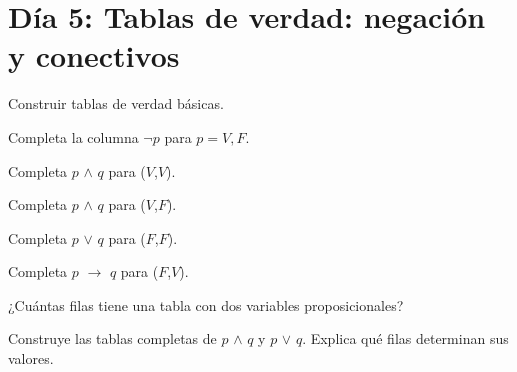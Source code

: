 \section{Día 5: Tablas de verdad: negación y conectivos}

\begin{lesson}[id=dia-05-lectura,weight=0]

Construir tablas de verdad básicas.

\end{lesson}

\begin{activity}[id=dia-05-corta-01,type=short,weight=1]

Completa la columna \(\neg p\) para \(p=V,F\).

\end{activity}

\begin{activity}[id=dia-05-corta-02,type=short,weight=1]

Completa \(p\) \(\land\) \(q\) para (\(V\),\(V\)).

\end{activity}

\begin{activity}[id=dia-05-corta-03,type=short,weight=1]

Completa \(p\) \(\land\) \(q\) para (\(V\),\(F\)).

\end{activity}

\begin{activity}[id=dia-05-corta-04,type=short,weight=1]

Completa \(p\) \(\lor\) \(q\) para (\(F\),\(F\)).

\end{activity}

\begin{activity}[id=dia-05-corta-05,type=short,weight=1]

Completa \(p\) \(\to\) \(q\) para (\(F\),\(V\)).

\end{activity}

\begin{activity}[id=dia-05-corta-06,type=short,weight=1]

¿Cuántas filas tiene una tabla con dos variables proposicionales?

\end{activity}

\begin{activity}[id=dia-05-desarrollo-01,type=long,weight=2]

Construye las tablas completas de \(p\) \(\land\) \(q\) y \(p\) \(\lor\) \(q\). Explica qué filas determinan sus valores.

\end{activity}

